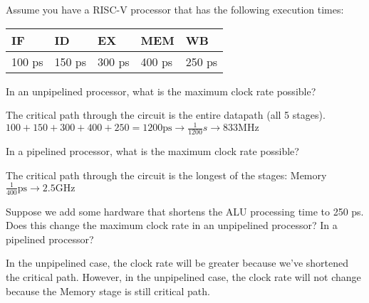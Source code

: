 \begin{blocksection}
\question
Assume you have a RISC-V processor that has the following execution times:

\begin{tabular}{ |l|l|l|l|l| } 
 \hline
 IF & ID & EX & MEM & WB \\
 \hline
 100 ps & 150 ps & 300 ps & 400 ps & 250 ps \\
 \hline
\end{tabular}

\begin{parts}
\item In an unpipelined processor, what is the maximum clock rate possible?

\begin{solution}[0.5in]
The critical path through the circuit is the entire datapath (all 5 stages).
$100 + 150 + 300 + 400 + 250 = 1200 \text{ps} \rightarrow \frac{1}{1200} s \rightarrow 833 \text{MHz}$
\end{solution}

\item In a pipelined processor, what is the maximum clock rate possible?

\begin{solution}[0.5in]
The critical path through the circuit is the longest of the stages: Memory
$\frac{1}{400} \text{ps} \rightarrow 2.5 \text{GHz}$
\end{solution}

\item Suppose we add some hardware that shortens the ALU processing time to 250 ps. Does this change the maximum clock rate in an unpipelined processor? In a pipelined processor?

\begin{solution}[0.5in]
In the unpipelined case, the clock rate will be greater because we’ve shortened the critical path. However, in the unpipelined case, the clock rate will not change because the Memory stage is still critical path.
\end{solution}

\end{parts}
\end{blocksection}